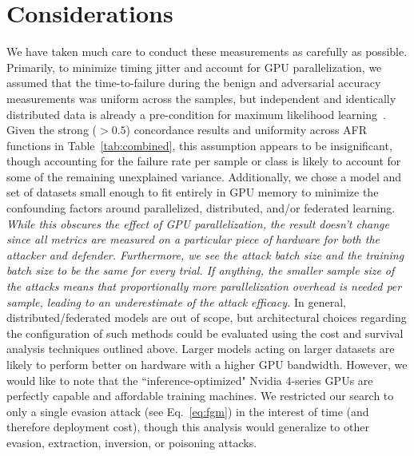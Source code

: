 \documentclass[conference]{IEEEtran}
\newcommand{\cm}[1]{\textit{{\color{blue}#1}}}
\begin{document}
\section{Considerations}
\label{considerations}
We have taken much care to conduct these measurements as carefully as possible. Primarily, to minimize timing jitter and account for GPU parallelization, we assumed that the time-to-failure during the benign and adversarial accuracy measurements was uniform across the samples, but independent and identically distributed data is already a pre-condition for maximum likelihood learning~\cite{ma2022state}. Given the strong ($>0.5$) concordance results and uniformity across AFR functions in Table~\ref{tab:combined}, this assumption appears to be insignificant, though accounting for the failure rate per sample or class is likely to account for some of the remaining unexplained variance. Additionally, we chose a model and set of datasets small enough to fit entirely in GPU memory to minimize the confounding factors around parallelized, distributed, and/or federated learning. \cm{While this obscures the effect of GPU parallelization, the result doesn't change since all metrics are measured on a particular piece of hardware for both the attacker and defender. Furthermore, we see the attack batch size and the training batch size to be the same for every trial. If anything, the smaller sample size of the attacks means that proportionally more parallelization overhead is needed per sample, leading to an underestimate of the attack efficacy.} In general, distributed/federated models are out of scope, but architectural choices regarding the configuration of such methods could be evaluated using the cost and survival analysis techniques outlined above. Larger models acting on larger datasets are likely to perform better on hardware with a higher GPU bandwidth. However, we would like to note that the ``inference-optimized" Nvidia 4-series GPUs are perfectly capable and affordable training machines. We restricted our search to only a single evasion attack (see Eq.~\ref{eq:fgm}) in the interest of time (and therefore deployment cost), though this analysis would generalize to other evasion, extraction, inversion, or poisoning attacks.
\end{document}

